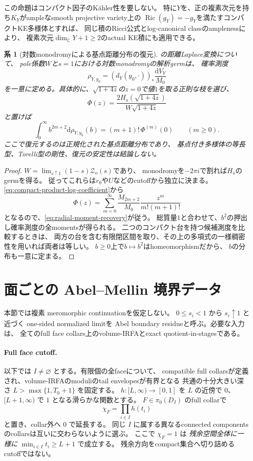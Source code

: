 \documentclass[11pt,a4paper]{ltjsarticle}
\newcommand{\CC}{\mathbb C}
\newcommand{\dd}{\mathrm d}
\newcommand{\Ric}{\operatorname{Ric}}
\theoremstyle{plain}
\newtheorem{corollary}[corollary]{系}
\theoremstyle{definition}
\theoremstyle{remark}
\begin{document}
この命題はコンパクト因子のKähler性を要しない。
特に$Y$を、正の複素次元を持ち$K_Y$がampleなsmooth projective variety上の
$\Ric(g_Y)=-g_Y$を満たすコンパクトKE多様体とすれば、
同じ積のRicci公式とlog-canonical classのamplenessにより、
複素次元$\dim_{\CC}Y+1\ge2$のactual KE積にも適用できる。

\begin{corollary}[対数monodromyによる基点距離分布の復元]
\label{cor:compact-radial-recovery}
の距離Laplace変換について、
pole係数$W$と$s=1$における対数monodromyの解析germは、
確率測度
\[
 \rho_{Y,y_0}
 =(d_Y(y_0,\cdot))_*\frac{\dd V_Y}{M_0}
\]
を一意に定める。具体的に、$\sqrt{1+4z}$の$z=0$で値$1$を取る正則な枝を選び、
\[
 \Phi(z)=\frac{2H_o(\sqrt{1+4z})}{W\sqrt{1+4z}}
\]
と置けば
\begin{equation}
\label{eq:radial-moment-recovery}
 \int_0^\infty b^{2m+2}\dd\rho_{Y,y_0}(b)
       =(m+1)!\,\Phi^{(m)}(0)
 \qquad(m\ge0).
\end{equation}
ここで復元するのは正規化された基点距離分布であり、
基点付き多様体の等長型、Torelli型の剛性、復元の安定性は結論しない。
\end{corollary}
\begin{proof}
$W=\lim_{s\uparrow1}(1-s)\mathcal Z_o(s)$であり、
monodromyを$-2\pi i$で割れば$H_o$のgermを得る。
従ってこれらは$r_0$や$U$などのcutoffから独立に決まる。
\eqref{eq:compact-product-log-coefficient}から
\[
 \Phi(z)=\sum_{m=0}^{\infty}
          \frac{M_{2m+2}}{M_0}\frac{z^m}{m!(m+1)!}
\]
となるので、\eqref{eq:radial-moment-recovery}が従う。
総質量$1$と合わせて、$b^2$の押出し確率測度の全momentsが得られる。
二つのコンパクト台を持つ候補測度を比較するときは、
両方の台を含む有限閉区間を取り、その上の多項式の一様稠密性を用いれば両者は等しい。
$b\ge0$上で$b\mapsto b^2$はhomeomorphismだから、
$b$の分布も一意に定まる。
\end{proof}

\section{面ごとの Abel--Mellin 境界データ}
\label{sec:Mellin}

本節では複素 meromorphic continuationを仮定しない。
$0\le s_i<1$ から $s_i\uparrow1$ と近づく one-sided normalized limitを
Abel boundary residueと呼ぶ。必要な入力は、
全てのfull face collars上のvolume-IRFAとexact quotient-in-stagesである。

\paragraph{Full face cutoff.}
以下では $I\ne\varnothing$ とする。有限個の全faceについて、
compatible full collarsが定義され、volume-IRFAのmoduliのtail envelopesが有界となる
共通の十分大きい深さ $L>\max\{1,T_0+1\}$ を固定する。
$h:[L,\infty)\to[0,1]$ を $L$ の近傍で $0$、
$[L+1,\infty)$ で $1$ となる滑らかな関数とする。
$F\in\pi_0(D_I)$ のfull collarで
\[
 \chi_F=\prod_{i\in I}h(t_i)
\]
と置き、collar外へ $0$ で延長する。
同じ $I$ に属する異なるconnected componentsのcollarsは互いに交わらないように選ぶ。
ここで $\chi_F=1$ は \emph{残余空間全体に一様に}
$\min_{i\in I}t_i\ge L+1$ で成立する。
残余方向をcompact集合へ切り詰めるcutoffではない。
\end{document}
